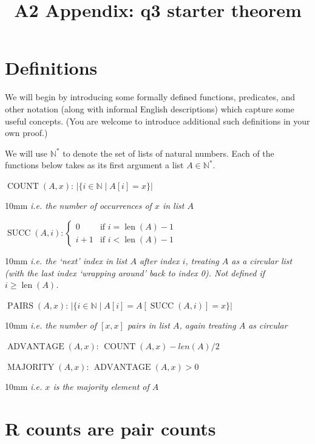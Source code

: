 \documentclass[boldsans]{article}
\title{A2 Appendix: q3 starter theorem}
\date{}
\newcommand{\N}{\mathbb{N}}
\DeclareMathOperator{\len}{len}
\begin{document}
\maketitle

\newcommand{\COUNT}{\operatorname{COUNT}}
\newcommand{\ad}{\operatorname{ADVANTAGE}}
\newcommand{\maj}{\operatorname{MAJORITY}}
\newcommand{\pairs}{\operatorname{PAIRS}}
\newcommand{\ppairs}{\operatorname{PPAIRS}}
\newcommand{\SUCC}{\operatorname{SUCC}}
\newcommand{\R}{\operatorname{R}}

\section{Definitions}
We will begin by introducing some formally defined functions, predicates, and other notation (along with informal English descriptions) which capture some useful concepts. (You are welcome to introduce additional such definitions in your own proof.)

\newcommand{\gloss}[1]{
\begin{adjustwidth}{10mm}{}
\textit{ i.e. #1 }
\end{adjustwidth}
}

We will use $\N^*$ to denote the set of lists of natural numbers. Each of the functions below takes as its first argument a list $A \in \N^*$.

$\COUNT(A, x)$: $| \{ i \in \N \mid A[i] = x\} |$

\gloss{the number of occurrences of $x$ in list $A$}

$\SUCC(A, i): \begin{cases}
  0 &\text{if } i = \len(A)-1 \\
  i+1 &\text{if } i < \len(A)-1
\end{cases}$

\gloss{the `next' index in list $A$ after index $i$, treating $A$ as a circular list (with the last index `wrapping around' back to index 0). Not defined if $i \geq \len(A)$.}

$\pairs(A, x)$: $|  \{ i \in \N \mid A[i] = A[\SUCC(A, i)] = x\} |$

\gloss{the number of $[x, x]$ pairs in list $A$, again treating $A$ as circular}

$\ad(A, x)$: $\COUNT(A, x) - len(A) / 2$

$\maj(A, x)$: $\ad(A, x) > 0$

\gloss{$x$ is the majority element of $A$}


\section{R counts are pair counts}
\end{document}
